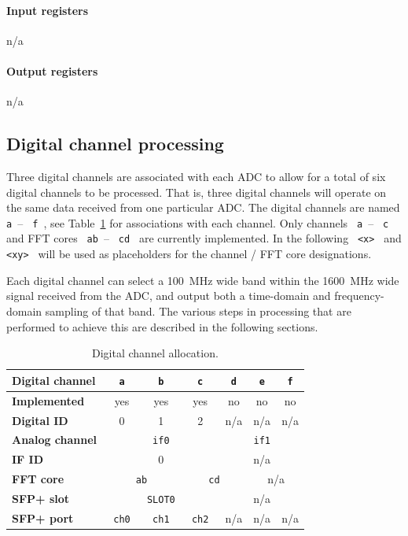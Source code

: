 \documentclass[a4paper,10pt]{article}
\newcommand{\tabref}[1]{Table~\ref{#1}}
\newcommand{\ilcode}[1]{\begingroup
	\setlength{\fboxsep}{1pt}\colorbox{ilcodebg}{\small\tt%
		#1%
	}\endgroup}
\begin{document}
\paragraph{Input registers}
n/a

\paragraph{Output registers}
n/a

\subsection{Digital channel processing}
\label{sec:gwdcp}
Three digital channels are associated with each ADC to allow for a total 
of six digital channels to be processed. That is, three digital channels 
will operate on the same data received from one particular ADC.  The 
digital channels are named \ilcode{a}--\ilcode{f}, see 
\tabref{tab:digitalchannels} for associations with each channel. Only 
channels \ilcode{a}--\ilcode{c} and FFT cores \ilcode{ab}--\ilcode{cd} 
are currently implemented.  In the following \ilcode{<x>} and 
\ilcode{<xy>} will be used as placeholders for the channel / FFT core 
designations.

Each digital channel can select a 100~MHz wide band within the 1600~MHz 
wide signal received from the ADC, and output both a time-domain and 
frequency-domain sampling of that band. The various steps in processing 
that are performed to achieve this are described in the following 
sections.

\begin{table}[h]
	\centering
	\begin{tabular}{|l|c|c|c|c|c|c|}
		\hline
		{\bf Digital channel} & \ilcode{a} & \ilcode{b} & \ilcode{c} & \ilcode{d} & \ilcode{e} & \ilcode{f}\\
		\hline
		{\bf Implemented} & yes & yes & yes & no & no & no\\
		\hline
		{\bf Digital ID} & 0 & 1 & 2 & n/a & n/a & n/a\\
		\hline
		{\bf Analog channel} & \multicolumn{3}{c|}{\ilcode{if0}} & \multicolumn{3}{c|}{\ilcode{if1}}\\
		\hline
		{\bf IF ID} & \multicolumn{3}{c|}{0} & \multicolumn{3}{c|}{n/a}\\
		\hline
		{\bf FFT core} & \multicolumn{2}{c|}{\ilcode{ab}} & \multicolumn{2}{c|}{\ilcode{cd}} & \multicolumn{2}{c|}{n/a}\\
		\hline
		{\bf SFP+ slot} & \multicolumn{3}{c|}{\ilcode{SLOT0}} & \multicolumn{3}{c|}{n/a}\\
		\hline
		{\bf SFP+ port} & \ilcode{ch0} & \ilcode{ch1} & \ilcode{ch2} & n/a & n/a & n/a\\
		\hline
	\end{tabular}
	\caption{Digital channel allocation.}
	\label{tab:digitalchannels}
\end{table}
\end{document}
